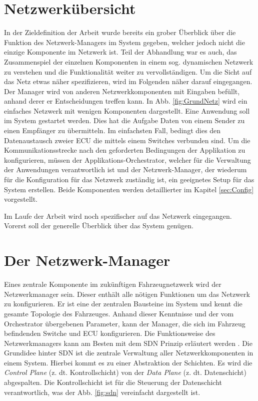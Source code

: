 \section{Netzwerkübersicht}
In der Zieldefinition der Arbeit wurde bereits ein grober Überblick über die Funktion des Netzwerk-Managers im System gegeben, welcher jedoch nicht die einzige Komponente im Netzwerk ist. Teil der Abhandlung war es auch, das Zusammenspiel der einzelnen Komponenten in einem sog. dynamischen Netzwerk zu verstehen und die Funktionalität weiter zu vervollständigen. Um die Sicht auf das Netz etwas näher spezifizieren, wird im Folgenden näher darauf eingegangen. \newline
Der Manager wird von anderen Netzwerkkomponenten mit Eingaben befüllt, anhand derer er Entscheidungen treffen kann. In Abb. \ref{fig:GrundNetz} wird ein einfaches Netzwerk mit wenigen Komponenten dargestellt. Eine Anwendung soll im System gestartet werden. Dies hat die Aufgabe Daten von einem Sender zu einen Empfänger zu übermitteln. Im einfachsten Fall, bedingt dies den Datenaustausch zweier \ac{ECU} die mittels einem Switches verbunden sind. Um die Kommunikationsstrecke nach den geforderten Bedingungen der Applikation zu konfigurieren, müssen der Applikations-Orchestrator, welcher für die Verwaltung der Anwendungen verantwortlich ist und der Netzwerk-Manager, der wiederum für die Konfiguration für das Netzwerk zuständig ist, ein geeignetes Setup für das System erstellen. Beide Komponenten werden detaillierter im Kapitel \ref{sec:Config} vorgestellt. 

Im Laufe der Arbeit wird noch spezifischer auf das Netzwerk eingegangen. Vorerst soll der generelle Überblick über das System genügen.


\section{Der Netzwerk-Manager}\label{sec:Netzwerkmanager}
Eines zentrale Komponente im zukünftigen Fahrzeugnetzwerk wird der Netzwerkmanager sein. Dieser enthält alle nötigen Funktionen um das Netzwerk zu konfigurieren. Er ist eine der zentralen Bausteine im System und kennt die gesamte Topologie des Fahrzeuges. Anhand dieser Kenntnisse und der vom Orchestrator übergebenen Parameter, kann der Manager, die sich im Fahrzeug befindenden Switche und \ac{ECU} konfigurieren. Die Funktionsweise des Netzwerkmanagers kann am Besten mit dem \acf{SDN} Prinzip erläutert werden \cite{SDNBook}. Die Grundidee hinter \ac{SDN} ist die zentrale Verwaltung aller Netzwerkkomponenten in einem System. Hierbei kommt es zu einer Abstraktion der Schichten. Es wird die \emph{Control Plane} (z. dt. Kontrollschicht) von der \emph{Data Plane} (z. dt. Datenschicht) abgespalten. Die Kontrollschicht ist für die Steuerung der Datenschicht verantwortlich, was der Abb. \ref{fig:sdn} vereinfacht dargestellt ist. 

